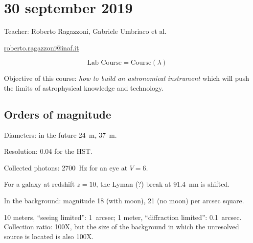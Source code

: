 \documentclass[main.tex]{subfiles}
\begin{document}
\section*{30 september 2019}

Teacher: Roberto Ragazzoni, Gabriele Umbriaco et al.

\url{roberto.ragazzoni@inaf.it}

\begin{equation}
    \text{Lab Course} = \text{Course} (\lambda)
\end{equation}

Objective of this course: \emph{how to build an astronomical instrument} which will push the limits of astrophysical knowledge and technology.

\subsection{Orders of magnitude}

Diameters: in the future \SI{24}{m}, \SI{37}{m}.

Resolution: \SI{0.04}{\arcsec} for the HST.

Collected photons: \SI{2700}{Hz} for an eye at \(V=6\).

For a galaxy at redshift \(z=10\), the Lyman (?) break at \SI{91.4}{nm} is shifted.

In the background: magnitude 18 (with moon), 21 (no moon) per arcsec square.

10 meters, ``seeing limited'': \SI{1}{arcsec}; 1 meter, ``diffraction limited'': \SI{0.1}{arcsec}. Collection ratio: 100X, but the size of the background in which the unresolved source is located is also 100X.
\end{document}
